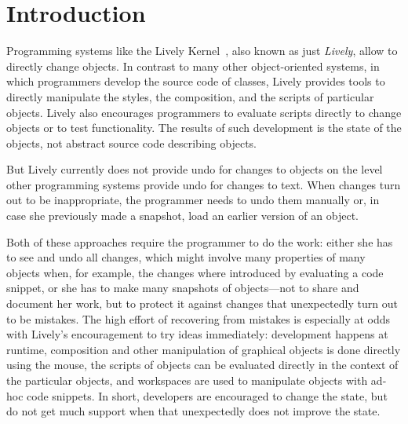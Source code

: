
\chapter{Introduction} \label{chapter:INTRODUCTION}

Programming systems like the Lively Kernel~\cite{Ingalls2008LKS,Krahn2009LWD}, also known as just \emph{Lively}, allow to directly change objects.
In contrast to many other object-oriented systems, in which programmers develop the source code of classes, Lively provides tools to directly manipulate the styles, the composition, and the scripts of particular objects.
Lively also encourages programmers to evaluate scripts directly to change objects or to test functionality.
The results of such development is the state of the objects, not abstract source code describing objects.

But Lively currently does not provide undo for changes to objects on the level other programming systems provide undo for changes to text.
When changes turn out to be inappropriate, the programmer needs to undo them manually or, in case she previously made a snapshot, load an earlier version of an object.

Both of these approaches require the programmer to do the work: either she has to see and undo all changes, which might involve many properties of many objects when, for example, the changes where introduced by evaluating a code snippet, or she has to make many snapshots of objects---not to share and document her work, but to protect it against changes that unexpectedly turn out to be mistakes.
The high effort of recovering from mistakes is especially at odds with Lively's encouragement to try ideas immediately: development happens at runtime, composition and other manipulation of graphical objects is done directly using the mouse, the scripts of objects can be evaluated directly in the context of the particular objects, and workspaces are used to manipulate objects with ad-hoc code snippets.
In short, developers are encouraged to change the state, but do not get much support when that unexpectedly does not improve the state.


